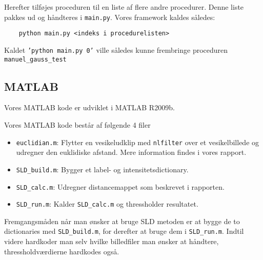 \documentclass[a4paper,12pt]{article}
\begin{document}
Herefter tilføjes proceduren til en liste af flere andre procedurer. Denne liste pakkes ud og håndteres i \texttt{main.py}. Vores framework kaldes således: 
\begin{verbatim}
	python main.py <indeks i procedurelisten>
\end{verbatim}

Kaldet \texttt{'python main.py 0'} ville således kunne frembringe proceduren\\ \texttt{manuel\_gauss\_test}
\newpage
\subsection*{MATLAB}
Vores MATLAB kode er udviklet i MATLAB R2009b.


Vores MATLAB kode består af følgende 4 filer 
\begin{itemize}
	\item \texttt{euclidian.m}: Flytter en vesikeludklip med \texttt{nlfilter} over et vesikelbillede og udregner den euklidiske afstand. Mere information findes i vores rapport. 

	\item \texttt{SLD\_build.m}: Bygger et label- og intensitetsdictionary. 
	\item \texttt{SLD\_calc.m}: Udregner distancemappet som beskrevet i rapporten. 
	\item \texttt{SLD\_run.m}: Kalder \texttt{SLD\_calc.m} og thressholder resultatet.
\end{itemize}

	Fremgangsmåden når man ønsker at bruge SLD metoden
	er at bygge de to dictionaries med \texttt{SLD\_build.m}, for derefter at bruge dem i \texttt{SLD\_run.m}. Indtil videre hardkoder man selv hvilke billedfiler man ønsker at håndtere, thressholdværdierne hardkodes også.

	
\end{document}
